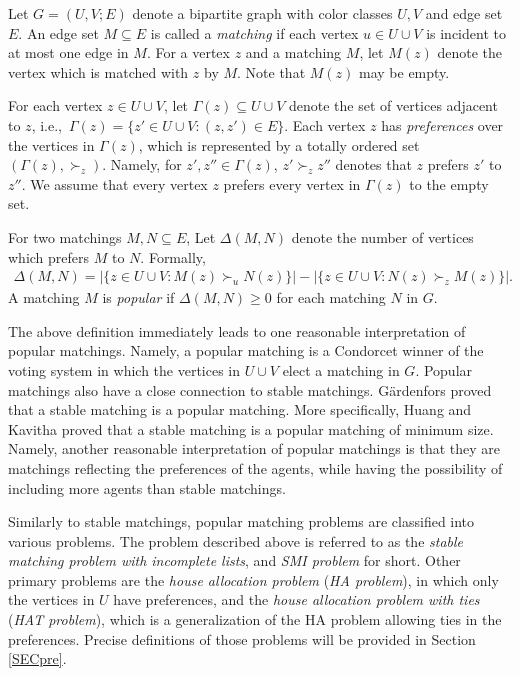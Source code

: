 \documentclass[11pt,a4paper,showkeys]{article}
\theoremstyle{plain}
\theoremstyle{definition}
\begin{document}
Let $G=(U,V;E)$ denote a bipartite graph with color classes $U,V$ and edge set $E$. 
An edge set $M\subseteq E$ is called a \emph{matching} if 
each vertex $u\in U\cup V$ is incident to at most one edge in $M$. 
For a vertex $z$ and a matching $M$, 
let $M(z)$ denote the vertex which is matched with $z$ by $M$. 
Note that $M(z)$ may be empty. 

For each vertex $z\in U\cup V$, 
let $\Gamma(z)\subseteq U\cup V$ denote the set of vertices adjacent to $z$, 
i.e.,\ 
$\Gamma(z) =\{ z' \in U\cup V \colon (z,z')\in E\}$. 
Each vertex $z$ has \emph{preferences} over the vertices in $\Gamma(z)$, 
which is represented by a totally ordered set $(\Gamma(z), \succ_z)$. 
Namely, for $z',z''\in \Gamma(z)$, 
$z' \succ_z z''$ denotes that $z$ prefers $z'$ to $z''$. 
We assume that every vertex $z$ prefers every vertex in $\Gamma(z)$ to the empty set. 

For two matchings $M,N\subseteq E$, 
Let $\Delta(M,N)$ denote the number of vertices which prefers $M$ to $N$. 
Formally, 
\begin{align*}
\Delta (M,N) = |\{z\in U\cup V \colon M(z) \succ_u N(z)\}| - |\{z\in U\cup V \colon N(z) \succ_z M(z)\}|. 
\end{align*}
A matching $M$ is \emph{popular} if 
$\Delta(M,N) \ge 0$ for each matching $N$ in $G$. 

The above definition immediately leads to one reasonable interpretation of popular matchings. 
Namely, a popular matching is a Condorcet winner of the voting system 
in which the vertices in $U\cup V$ elect a matching in $G$. 
Popular matchings also have a close connection to stable matchings. 
G\"ardenfors \cite{Gar75} proved that a stable matching is a popular matching. 
More specifically, 
Huang and Kavitha \cite{HK13} proved that a stable matching is a popular matching of minimum size. 
Namely, 
another reasonable interpretation of popular matchings is that 
they are matchings reflecting the preferences of the agents, 
while having the possibility of including more agents than stable matchings. 


Similarly to stable matchings, 
popular matching problems are classified into various problems. 
The problem described above is referred to as the \emph{stable matching problem with incomplete lists}, 
and \emph{SMI problem} for short. 
Other primary problems are the \emph{house allocation problem} (\emph{HA problem}), 
in which only the vertices in $U$ have preferences, 
and 
the \emph{house allocation problem with ties} (\emph{HAT problem}), 
which is a generalization of the HA problem allowing ties in the preferences. 
Precise definitions of those problems will be provided in Section \ref{SECpre}. 
\end{document}
